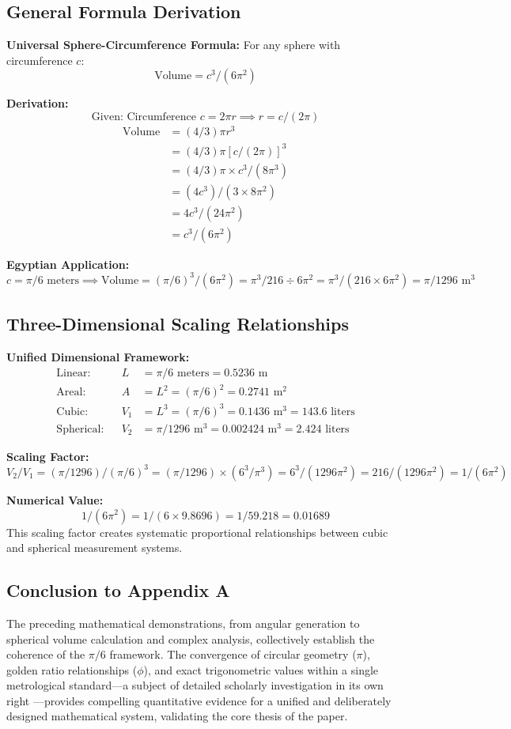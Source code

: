 \documentclass[11pt]{article}
\begin{document}
\subsection{General Formula Derivation}
\textbf{Universal Sphere-Circumference Formula:} For any sphere with circumference $c$:
\[ \text{Volume} = c^3/(6\pi^2) \]

\textbf{Derivation:}
\[ \text{Given: Circumference } c = 2\pi r \implies r = c/(2\pi) \]
\begin{align*}
\text{Volume} &= (4/3)\pi r^3 \\
             &= (4/3)\pi[c/(2\pi)]^3 \\
             &= (4/3)\pi \times c^3/(8\pi^3) \\
             &= (4c^3)/(3 \times 8\pi^2) \\
             &= 4c^3/(24\pi^2) \\
             &= c^3/(6\pi^2)
\end{align*}

\textbf{Egyptian Application:}
\[ c = \pi/6 \text{ meters} \implies \text{Volume} = (\pi/6)^3/(6\pi^2) = \pi^3/216 \div 6\pi^2 = \pi^3/(216 \times 6\pi^2) = \pi/1296 \text{ m}^3 \]

\subsection{Three-Dimensional Scaling Relationships}
\textbf{Unified Dimensional Framework:}
\begin{align*}
\text{Linear:}    && L &= \pi/6 \text{ meters} = 0.5236 \text{ m} \\
\text{Areal:}     && A &= L^2 = (\pi/6)^2 = 0.2741 \text{ m}^2 \\
\text{Cubic:}     && V_1 &= L^3 = (\pi/6)^3 = 0.1436 \text{ m}^3 = 143.6 \text{ liters} \\
\text{Spherical:} && V_2 &= \pi/1296 \text{ m}^3 = 0.002424 \text{ m}^3 = 2.424 \text{ liters}
\end{align*}

\textbf{Scaling Factor:}
\[ V_2/V_1 = (\pi/1296) / (\pi/6)^3 = (\pi/1296) \times (6^3/\pi^3) = 6^3/(1296\pi^2) = 216/(1296\pi^2) = 1/(6\pi^2) \]

\textbf{Numerical Value:}
\[ 1/(6\pi^2) = 1/(6 \times 9.8696) = 1/59.218 = 0.01689 \]
This scaling factor creates systematic proportional relationships between cubic and spherical measurement systems.

\subsection*{Conclusion to Appendix A}
The preceding mathematical demonstrations, from angular generation to spherical volume calculation and complex analysis, collectively establish the coherence of the $\pi/6$ framework. The convergence of circular geometry ($\pi$), golden ratio relationships ($\phi$), and exact trigonometric values within a single metrological standard---a subject of detailed scholarly investigation in its own right \cite{herz-fischler2000shape}---provides compelling quantitative evidence for a unified and deliberately designed mathematical system, validating the core thesis of the paper.
\end{document}
